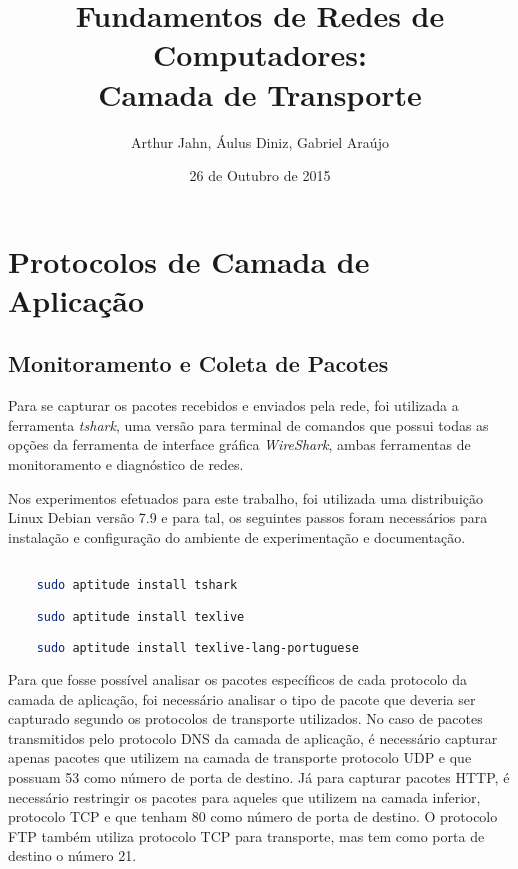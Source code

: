\documentclass[a4paper]{report} %
\title{Fundamentos de Redes de Computadores: \\ Camada de Transporte}
\author{Arthur Jahn, Áulus Diniz, Gabriel Araújo}
\date{26 de Outubro de 2015}    %
\begin{document}
\maketitle  %

\tableofcontents %
\chapter{Protocolos de Camada de Aplicação}
\label{chap_primeiro} %

\section{Monitoramento e Coleta de Pacotes}
\label{sec_primeiro_monitoramento}

	Para	se capturar os pacotes recebidos e enviados pela rede, foi utilizada a ferramenta \textit{tshark}, uma versão para terminal de comandos que possui todas as opções da ferramenta de interface gráfica \textit{WireShark}, ambas ferramentas de monitoramento e diagnóstico de redes.

	Nos experimentos efetuados para este trabalho, foi utilizada uma distribuição Linux Debian versão 7.9 e para tal, os seguintes passos foram necessários para instalação e configuração do ambiente de experimentação e documentação.
\begin{lstlisting}[language=bash]

	sudo aptitude install tshark

	sudo aptitude install texlive

	sudo aptitude install texlive-lang-portuguese


\end{lstlisting}

	Para que fosse possível analisar os pacotes específicos de cada protocolo da camada de aplicação, foi necessário analisar o tipo de pacote que deveria ser capturado segundo os protocolos de transporte utilizados. No caso de pacotes transmitidos pelo protocolo DNS da camada de aplicação, é necessário capturar apenas pacotes que utilizem na camada de transporte protocolo UDP e que possuam 53 como número de porta de destino. Já para capturar pacotes HTTP, é necessário restringir os pacotes para aqueles que utilizem na camada inferior, protocolo TCP e que tenham 80 como número de porta de destino. O protocolo FTP
também utiliza protocolo TCP para transporte, mas tem como porta de destino o número 21.
\end{document}
